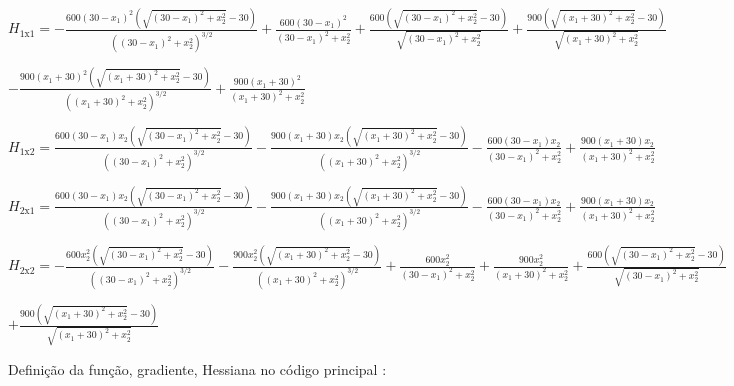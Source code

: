 \documentclass[10pt, a4paper]{article}
\begin{document}
\vspace{5mm}

$H_{1\text{x}1} = -\frac{600 (30 - x_1)^2 (\sqrt{(30 - x_1)^2 + x_2^2} - 30)}{((30 - x_1)^2 + x_2^2)^{3/2}} +
\frac{600 (30 - x_1)^2}{(30 - x_1)^2 + x_2^2} +
\frac{600 (\sqrt{(30 - x_1)^2 + x_2^2} - 30)}{\sqrt{(30 - x_1)^2 + x_2^2}} +
\frac{900 (\sqrt{(x_1 + 30)^2 + x_2^2} - 30)}{\sqrt{(x_1 + 30)^2 + x_2^2}}$

\hspace{3em}
$-\frac{900 (x_1 + 30)^2 (\sqrt{(x_1 + 30)^2 + x_2^2} - 30)}{((x_1 + 30)^2 + x_2^2)^{3/2}} +
\frac{900 (x_1 + 30)^2}{(x_1 + 30)^2 + x_2^2}$

\vspace{5mm}

$H_{1\text{x}2} = \frac{600 (30 - x_1) x_2 (\sqrt{(30 - x_1)^2 + x_2^2} - 30)}{((30 - x_1)^2 + x_2^2)^{3/2}} -
\frac{900 (x_1 + 30) x_2 (\sqrt{(x_1 + 30)^2 + x_2^2} - 30)}{((x_1 + 30)^2 + x_2^2)^{3/2}} -
\frac{600 (30 - x_1) x_2}{(30 - x_1)^2 + x_2^2} +
\frac{900 (x_1 + 30) x_2}{(x_1 + 30)^2 + x_2^2}$

\vspace{5mm}

$H_{2\text{x}1} = \frac{600 (30 - x_1) x_2 (\sqrt{(30 - x_1)^2 + x_2^2} - 30)}{((30 - x_1)^2 + x_2^2)^{3/2}} -
\frac{900 (x_1 + 30) x_2 (\sqrt{(x_1 + 30)^2 + x_2^2} - 30)}{((x_1 + 30)^2 + x_2^2)^{3/2}} -
\frac{600 (30 - x_1) x_2}{(30 - x_1)^2 + x_2^2} +
\frac{900 (x_1 + 30) x_2}{(x_1 + 30)^2 + x_2^2}$

\vspace{5mm}

$H_{2\text{x}2} = -\frac{600 x_2^2 (\sqrt{(30 - x_1)^2 + x_2^2} - 30)}{((30 - x_1)^2 + x_2^2)^{3/2}} -
\frac{900 x_2^2 (\sqrt{(x_1 + 30)^2 + x_2^2} - 30)}{((x_1 + 30)^2 + x_2^2)^{3/2}} +
\frac{600 x_2^2}{(30 - x_1)^2 + x_2^2} +
\frac{900 x_2^2}{(x_1 + 30)^2 + x_2^2} +
\frac{600 (\sqrt{(30 - x_1)^2 + x_2^2} - 30)}{\sqrt{(30 - x_1)^2 + x_2^2}}$

\hspace{3em}
$+\frac{900 (\sqrt{(x_1 + 30)^2 + x_2^2} - 30)}{\sqrt{(x_1 + 30)^2 + x_2^2}}$

\vspace{5mm}
Definição da função, gradiente, Hessiana no código principal :
\end{document}
